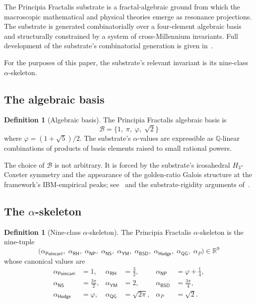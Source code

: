 \documentclass[11pt,a4paper]{amsart}
\theoremstyle{plain}
\theoremstyle{definition}
\newtheorem{definition}[theorem]{Definition}
\begin{document}
The Principia Fractalis substrate is a fractal-algebraic ground from which the macroscopic mathematical and physical theories emerge as resonance projections. The substrate is generated combinatorially over a four-element algebraic basis and structurally constrained by a system of cross-Millennium invariants. Full development of the substrate's combinatorial generation is given in~\cite[Chapters~1--6]{cohen2026book}.

For the purposes of this paper, the substrate's relevant invariant is its nine-class $\alpha$-skeleton.

\subsection{The algebraic basis}

\begin{definition}[Algebraic basis]\label{def:basis}
The Principia Fractalis algebraic basis is
\[
\mathcal{B} = \{1,\;\pi,\;\varphi,\;\sqrt{2}\}
\]
where $\varphi = (1+\sqrt{5})/2$. The substrate's $\alpha$-values are expressible as $\mathbb{Q}$-linear combinations of products of basis elements raised to small rational powers.
\end{definition}

The choice of $\mathcal{B}$ is not arbitrary. It is forced by the substrate's icosahedral $H_3$-Coxeter symmetry and the appearance of the golden-ratio Galois structure at the framework's IBM-empirical peaks; see~\cite[Chapter~9]{cohen2026book} and the substrate-rigidity arguments of~\cite{cohen2026bulletproof}.

\subsection{The \texorpdfstring{$\alpha$-skeleton}{alpha-skeleton}}\label{subsec:alpha-skeleton}

\begin{definition}[Nine-class $\alpha$-skeleton]\label{def:alpha-skeleton}
The Principia Fractalis $\alpha$-skeleton is the nine-tuple
\[
\bigl(\alpha_{\textsf{Poincar\'e}},\;\alpha_{\textsf{RH}},\;\alpha_{\textsf{NP}},\;\alpha_{\textsf{NS}},\;\alpha_{\textsf{YM}},\;\alpha_{\textsf{BSD}},\;\alpha_{\textsf{Hodge}},\;\alpha_{\textsf{QG}},\;\alpha_{P}\bigr) \in \mathbb{R}^9
\]
whose canonical values are
\[
\begin{aligned}
\alpha_{\textsf{Poincar\'e}} &= 1, &
\alpha_{\textsf{RH}} &= \tfrac{3}{2}, &
\alpha_{\textsf{NP}} &= \varphi + \tfrac{1}{4},\\
\alpha_{\textsf{NS}} &= \tfrac{3\pi}{2}, &
\alpha_{\textsf{YM}} &= 2, &
\alpha_{\textsf{BSD}} &= \tfrac{3\pi}{4},\\
\alpha_{\textsf{Hodge}} &= \varphi, &
\alpha_{\textsf{QG}} &= \sqrt{2\pi}, &
\alpha_{P} &= \sqrt{2}.
\end{aligned}
\]
\end{definition}
\end{document}

